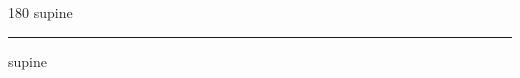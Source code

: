 
\begin{frame}
\begin{center}
\begin{turn}{180}
{\fontsize{2.5cm}{1em}\selectfont supine}
\end{turn}
\vspace{1em}\par  
\hrule
\vspace{1em}\par  
{\fontsize{2.5cm}{1em}\selectfont supine}
\end{center}
\end{frame}
